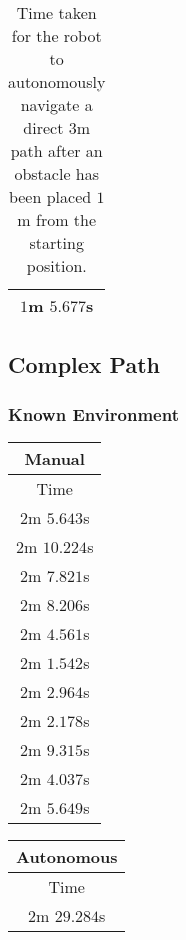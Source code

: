 \begin{appendices}
\begin{table}[!h]
\begin{tabular}{ c }
		\midrule
		$1$m $5.677$s \\
		\bottomrule
	\end{tabular}
	\caption{Time taken for the robot to autonomously navigate a direct $3$m path after an obstacle has been placed $1$m from the starting position.}
	\label{tab:eval_nav_dp}
\end{table}

\subsection{Complex Path}

\subsubsection{Known Environment}

\begin{table}[!h]
	\centering
	\begin{tabular}{ c }
		\toprule
		\textbf{Manual} \\
		\midrule
		Time \\
		\midrule
		$2$m $5.643$s \\

		$2$m $10.224$s \\

		$2$m $7.821$s \\

		$2$m $8.206$s \\

		$2$m $4.561$s \\

		$2$m $1.542$s \\

		$2$m $2.964$s \\

		$2$m $2.178$s \\

		$2$m $9.315$s \\

		$2$m $4.037$s \\

		\midrule
		$2$m $5.649$s \\
		\bottomrule
	\end{tabular}
	\hspace{2ex}
	\begin{tabular}{ c }
		\toprule
		\textbf{Autonomous} \\
		\midrule
		Time \\
		\midrule
		$2$m $29.284$s \\


\end{tabular}
\end{table}
\end{appendices}

